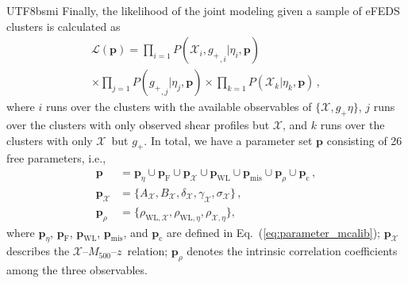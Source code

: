 \documentclass[longauth]{aa}
\newcommand{\Mfiveoo}{\ensuremath{M_{500}}}
\newcommand{\redshift}{\ensuremath{z}}
\newcommand{\gshear}{\ensuremath{g_{+}}}
\newcommand{\Xlabel}{\ensuremath{\mathcal{X}}}
\newcommand{\rate}{\ensuremath{\eta}}
\begin{document}
\begin{CJK*}{UTF8}{bsmi}
Finally, the likelihood of the joint modeling given a sample of eFEDS clusters is calculated as
%
\begin{multline}
\label{eq:like_sr}
\mathcal{L} \left(\mathbf{p}\right)
= \prod\limits_{i=1}
P\left(\Xlabel_{i}, {\gshear}_{,i}|\rate_{i}, \mathbf{p}\right) 
\\
\times
\prod\limits_{j=1}
P\left({\gshear}_{,j}|\rate_{j}, \mathbf{p}\right)
\times
\prod\limits_{k=1}
P\left(\Xlabel_{k}|\rate_{k}, \mathbf{p}\right)
\, ,
\end{multline}
%
where $i$ runs over the clusters with the available observables of $\{\Xlabel, \gshear \rate \}$,
$j$ runs over the clusters with only observed shear profiles but \Xlabel, 
and $k$ runs over the clusters with only \Xlabel\ but \gshear.
In total, we have a parameter set $\mathbf{p}$ consisting of 26 free parameters, i.e., 
%
\begin{align}
\label{eq:parameter_xsrmcalib}
\mathbf{p} &= 
\mathbf{p}_{\rate}\cup
\mathbf{p}_{\mathrm{F}}\cup
\mathbf{p}_{\mathcal{X}}\cup
\mathbf{p}_{\mathrm{WL}}\cup
\mathbf{p}_{\mathrm{mis}}\cup
\mathbf{p}_{\rho}\cup
\mathbf{p}_{\mathrm{c}}
\, , \nonumber \\
\mathbf{p}_{\mathcal{X}} &= \{ A_{\mathcal{X}},B_{\mathcal{X}}, \delta_{\mathcal{X}}, \gamma_{\mathcal{X}}, \sigma_{\mathcal{X}}  \} \, , \nonumber \\
\mathbf{p}_{\rho} &= \{\rho_{\mathrm{WL},\mathcal{X}}, \rho_{\mathrm{WL},\rate}, \rho_{\mathcal{X},\rate}\}, 
\,
\end{align}
%
where  $\mathbf{p}_{\rate}$, $\mathbf{p}_{\mathrm{F}}$, $\mathbf{p}_{\mathrm{WL}}$, $\mathbf{p}_{\mathrm{mis}}$, and $\mathbf{p}_{\mathrm{c}}$ are defined in Eq.~(\ref{eq:parameter_mcalib});
$\mathbf{p}_{\mathcal{X}}$ describes the $\mathcal{X}$--\Mfiveoo--\redshift\ relation;
$\mathbf{p}_{\rho}$ denotes the intrinsic correlation coefficients among the three observables.




\end{CJK*}
\end{document}
